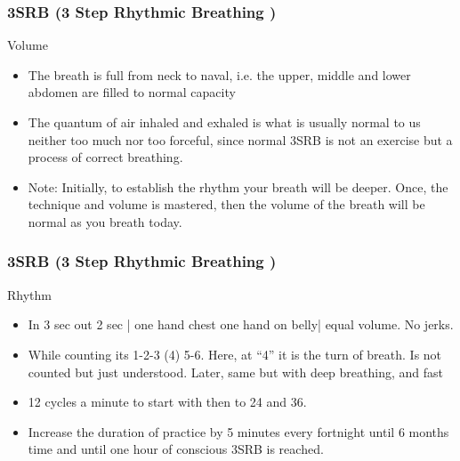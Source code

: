 \begin{frame}[fragile]
\frametitle{3SRB (3 Step Rhythmic Breathing )}

Volume

\begin{itemize}
\item The breath is full from neck to naval, i.e. the upper, middle and lower abdomen are filled to normal capacity
\item The quantum of air inhaled and exhaled is what is usually normal to us neither too much nor too forceful, since normal 3SRB is not an exercise but a process of correct breathing. 
\item Note: Initially, to establish the rhythm your breath will be deeper. Once, the technique and volume is mastered, then the volume of the breath will be normal as you breath today.
\end{itemize}
\end{frame}


\begin{frame}[fragile]
\frametitle{3SRB (3 Step Rhythmic Breathing )}

Rhythm

\begin{itemize}
\item In 3 sec out 2 sec | one hand chest one hand on belly| equal volume. No jerks. 
\item  While counting its 1-2-3 (4) 5-6. Here, at ``4'' it is the turn of breath. Is not counted but just understood. Later, same but with deep breathing, and fast
\item 12 cycles a minute to start with then to 24 and 36.
\item  Increase the duration of practice by 5 minutes every fortnight until 6 months time and until one hour of conscious 3SRB is reached.
\end{itemize}
\end{frame}


